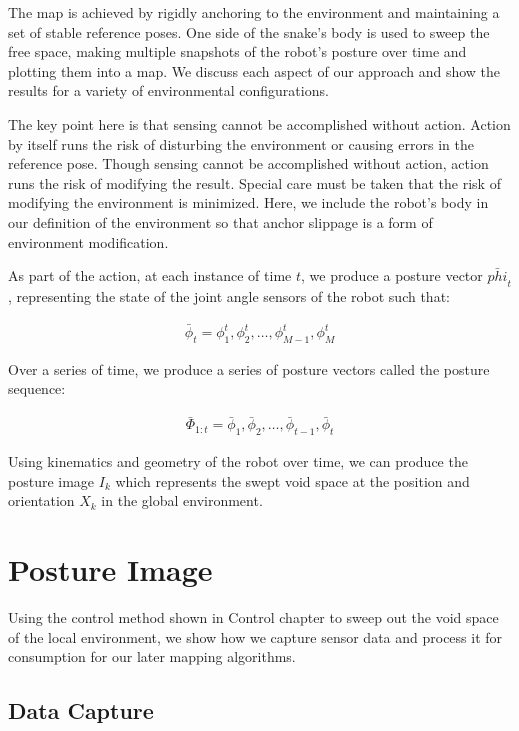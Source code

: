 The map is achieved by rigidly anchoring to the environment and maintaining a set of stable reference poses. One side of the snake's body is used to sweep the free space, making multiple snapshots of the robot's posture over time and plotting them into a map. We discuss each aspect of our approach and show the results for a variety of environmental configurations.

The key point here is that sensing cannot be accomplished without action. Action by itself runs the risk of disturbing the environment or causing errors in the reference pose. Though sensing cannot be accomplished without action, action runs the risk of modifying the result. Special care must be taken that the risk of modifying the environment is minimized. Here, we include the robot's body in our definition of the environment so that anchor slippage is a form of environment modification.

As part of the action, at each instance of time $t$, we produce a posture vector $\bar{phi}_t$, representing the state of the joint angle sensors of the robot such that:


\begin{eqnarray}
\bar{\phi}_t = { \phi^t_1, \phi^t_2, … , \phi^t_{M-1}, \phi^t_M}
\end{eqnarray}


Over a series of time, we produce a series of posture vectors called the posture sequence:


\begin{eqnarray}
\bar{\Phi}_{1:t} = { \bar{\phi}_1, \bar{\phi}_2, … , \bar{\phi}_{t-1}, \bar{\phi}_t}
\end{eqnarray}


Using kinematics and geometry of the robot over time, we can produce the posture image $I_{k}$ which represents the swept void space at the position and orientation $X_{k}$ in the global environment.

\section{Posture Image}
\label{postureimage}

Using the control method shown in Control chapter to sweep out the void space of the local environment, we show how we capture sensor data and process it for consumption for our later mapping algorithms.

\subsection{Data Capture}
\label{datacapture}

